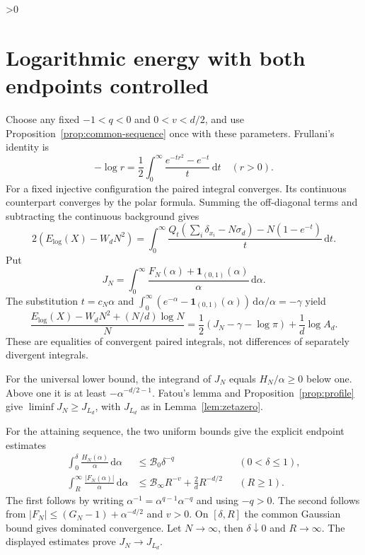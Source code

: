\documentclass[11pt,a4paper]{article}
\theoremstyle{definition}
\newcommand{\dd}{\,\mathrm d}
\newcommand{\abs}[1]{\lvert#1\rvert}
\newcommand{\one}{\mathbf1}
\numberwithin{equation}{section}
\let\originalsection\section
\renewcommand{\section}{\ifnum\value{section}>0\clearpage\fi\originalsection}
\begin{document}
\section{Logarithmic energy with both endpoints controlled}\label{sec:logarithmic}
Choose any fixed $-1<q<0$ and $0<v<d/2$, and use Proposition~\ref{prop:common-sequence} once with these parameters. Frullani's identity is
\begin{equation}\label{eq:frullani}
 -\log r=\frac12\int_0^\infty\frac{e^{-tr^2}-e^{-t}}t\dd t
 \quad(r>0).
\end{equation}
For a fixed injective configuration the paired integral converges. Its continuous counterpart converges by the polar formula. Summing the off-diagonal terms and subtracting the continuous background gives
\[
 2(E_{\log}(X)-W_dN^2)=
 \int_0^\infty\frac{Q_t(\sum_i\delta_{x_i}-N\sigma_d)-N(1-e^{-t})}{t}\dd t.
\]
Put
\begin{equation}\label{eq:JN}
 J_N=\int_0^\infty
       \frac{F_N(\alpha)+\one_{(0,1)}(\alpha)}\alpha\dd\alpha.
\end{equation}
The substitution $t=c_N\alpha$ and
$\int_0^\infty(e^{-\alpha}-\one_{(0,1)}(\alpha))\dd\alpha/\alpha=-\gamma$ yield
\begin{equation}\label{eq:logidentity}
 \frac{E_{\log}(X)-W_dN^2+(N/d)\log N}{N}
       =\frac12(J_N-\gamma-\log\pi)+\frac1d\log A_d.
\end{equation}
These are equalities of convergent paired integrals, not differences of separately divergent integrals.

For the universal lower bound, the integrand of $J_N$ equals $H_N/\alpha\ge0$ below one. Above one it is at least $-\alpha^{-d/2-1}$. Fatou's lemma and Proposition~\ref{prop:profile} give
$\liminf J_N\ge J_{L_d}$, with $J_{L_d}$ as in Lemma~\ref{lem:zetazero}.

For the attaining sequence, the two uniform bounds give the explicit endpoint estimates
\begin{align}
 \int_0^\delta\frac{H_N(\alpha)}\alpha\dd\alpha
       &\le\mathcal B_0\delta^{-q}&& (0<\delta\le1),
                                                    \label{eq:log-small-bound}\\
 \int_R^\infty\frac{\abs{F_N(\alpha)}}\alpha\dd\alpha
       &\le\mathcal B_\infty R^{-v}+\frac2dR^{-d/2}&& (R\ge1).
                                                    \label{eq:log-large-bound}
\end{align}
The first follows by writing $\alpha^{-1}=\alpha^{q-1}\alpha^{-q}$ and using $-q>0$. The second follows from
$\abs{F_N}\le(G_N-1)+\alpha^{-d/2}$ and $v>0$.
On $[\delta,R]$ the common Gaussian bound gives dominated convergence. Let $N\to\infty$, then $\delta\downarrow0$ and $R\to\infty$. The displayed estimates prove $J_N\to J_{L_d}$.
\end{document}
